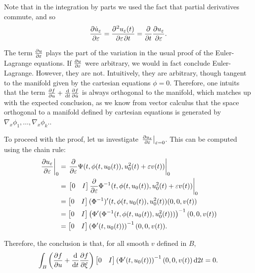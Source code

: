 \documentclass{article}
\theoremstyle{plain}
\theoremstyle{plain}
\theoremstyle{nonumberplain}
\theoremstyle{empty}
\DeclarePairedDelimiter\eval{.}{\rvert}
\begin{document}
\begin{itemize}
Note that in the integration by parts we used the fact that partial derivatives commute, and so
\[\diffp{\dot u_\varepsilon}\varepsilon = \diffp{u_\varepsilon(t)}{\varepsilon,t} = \diffp*{\diffp {u_\varepsilon} \varepsilon}t.\]

The term $\diffp u \varepsilon$ plays the part of the variation in the usual proof of the Euler-Lagrange equations. If $\diffp u \varepsilon$ were arbitrary, we would in fact conclude Euler-Lagrange. However, they are not. Intuitively, they are arbitrary, though tangent to the manifold given by the cartesian equations $\phi = 0$. Therefore, one intuits that the term $\diffp f u + \diff*{\diffp f {\dot u}}t$ is always orthogonal to the manifold, which matches up with the expected conclusion, as we know from vector calculus that the space orthogonal to a manifold defined by cartesian equations is generated by $\nabla_x \phi_1, \dots, \nabla_x \phi_k$..

To proceed with the proof, let us investigate $\eval*{\diffp {u_\varepsilon} \varepsilon}_{\varepsilon = 0}$. This can be computed using the chain rule:
\begin{align*}
\eval*{\diffp {u_\varepsilon} \varepsilon}_0 &= \eval*{\diffp*{\Psi(t, \phi(t,u_0(t)), u_0^2(t) + \varepsilon v(t))} \varepsilon}_0\\
&= \eval*{\begin{bmatrix} 0 & I \end{bmatrix} \diffp*{\Phi^{-1}(t, \phi(t,u_0(t)), u_0^2(t) + \varepsilon v(t))} \varepsilon}_0\\
&= \begin{bmatrix} 0 & I \end{bmatrix} (\Phi^{-1})'(t, \phi(t,u_0(t)), u_0^2(t)) (0, 0, v(t))\\
&= \begin{bmatrix} 0 & I \end{bmatrix} \left(\Phi'(\Phi^{-1}(t, \phi(t,u_0(t)), u_0^2(t)))\right)^{-1} (0,0,v(t))\\
&= \begin{bmatrix} 0 & I \end{bmatrix} \left( \Phi'(t, u_0(t)) \right)^{-1} (0,0,v(t)).
\end{align*}

Therefore, the conclusion is that, for all smooth $v$ defined in $B$,
\[
\int_B \left( \diffp f u + \diff*{\diffp f {\xi}}t \right) \begin{bmatrix} 0 & I \end{bmatrix} \left( \Phi'(t, u_0(t)) \right)^{-1} (0,0,v(t))\dl2 t = 0.
\]


\end{itemize}
\end{document}
